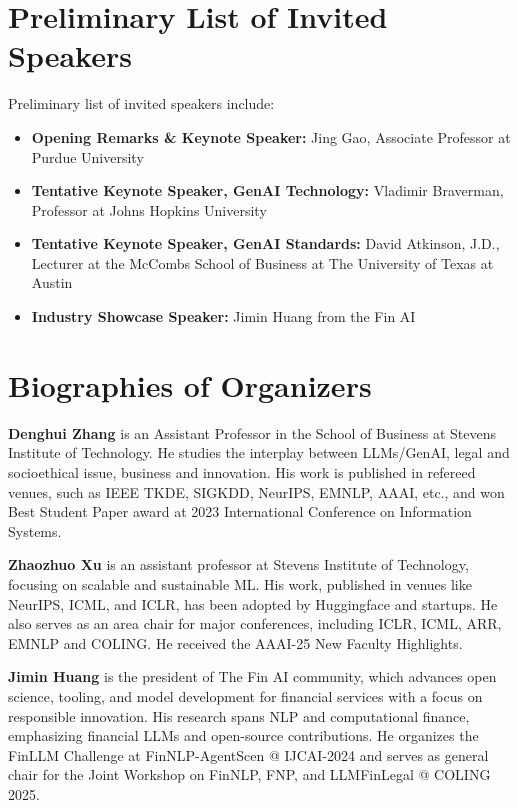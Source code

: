 \documentclass[conference]{IEEEtran}
\begin{document}
\section{Preliminary List of Invited Speakers}
Preliminary list of invited speakers include:
\begin{itemize}
    \item \textbf{Opening Remarks \& Keynote Speaker:} Jing Gao, Associate Professor at Purdue University
    \item \textbf{Tentative Keynote Speaker, GenAI Technology:} Vladimir Braverman, Professor at Johns Hopkins University
    \item \textbf{Tentative Keynote Speaker, GenAI Standards:} David Atkinson, J.D., Lecturer at the McCombs School of Business at The University of Texas at Austin
    \item \textbf{Industry Showcase Speaker:} Jimin Huang from the Fin AI
\end{itemize}

\section{Biographies of Organizers }
\noindent \textbf{Denghui Zhang} is an Assistant Professor in the School of Business at Stevens Institute of Technology. He studies the interplay between LLMs/GenAI, legal and socioethical issue, business and innovation. His work is published in refereed venues, such as IEEE TKDE, SIGKDD, NeurIPS, EMNLP, AAAI, etc., and won Best Student Paper award at 2023 International Conference on Information Systems.

\noindent \textbf{Zhaozhuo Xu} is an assistant professor at Stevens Institute of Technology, focusing on scalable and sustainable ML. His work, published in venues like NeurIPS, ICML, and ICLR, has been adopted by Huggingface and startups.  He also serves as an area chair for major conferences, including ICLR, ICML, ARR, EMNLP and COLING. He received the AAAI-25 New Faculty Highlights.

\noindent \textbf{Jimin Huang} is the president of The Fin AI community, which advances open science, tooling, and model development for financial services with a focus on responsible innovation. His research spans NLP and computational finance, emphasizing financial LLMs and open-source contributions. He organizes the FinLLM Challenge at FinNLP-AgentScen @ IJCAI-2024 and serves as general chair for the Joint Workshop on FinNLP, FNP, and LLMFinLegal @ COLING 2025.
\end{document}
